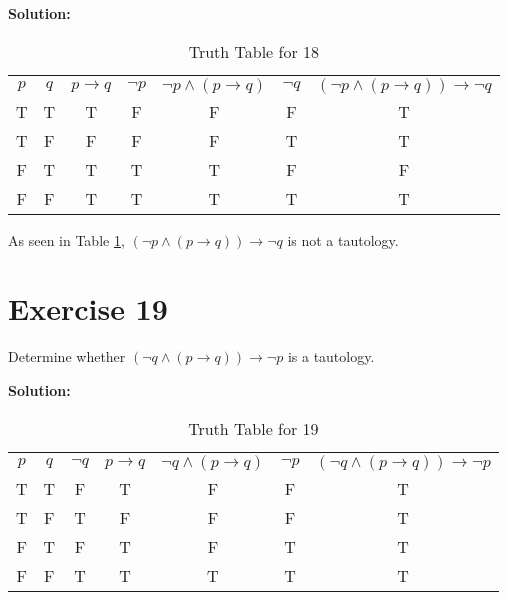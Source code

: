 \documentclass{Axon}
\begin{document}
\noindent
\textbf{Solution:}
\begin{table}[ht]
    \centering
    \begin{tabular}{c|c|c|c|c|c|c}
        \(p\) & \(q\) & \(p \to q\) & \(\lnot p\) & \(\lnot p \land (p \to q)\) & \(\lnot q\) & \((\lnot p \land (p \to q)) \to \lnot q\) \\
        T     & T     & T           & F           & F                           & F           & T                                         \\
        T     & F     & F           & F           & F                           & T           & T                                         \\
        F     & T     & T           & T           & T                           & F           & F                                         \\
        F     & F     & T           & T           & T                           & T           & T
    \end{tabular}
    \caption{Truth Table for 18}
    \label{Truth Table for 18}
\end{table}

As seen in Table \ref{Truth Table for 18}, \((\lnot p \land(p \to q)) \to \lnot q\) is not a tautology.

\section*{Exercise 19}
Determine whether \((\lnot q \land (p \to q)) \to \lnot p\) is a tautology.

\noindent
\textbf{Solution:}
\begin{table}[ht]
    \centering
    \begin{tabular}{c|c|c|c|c|c|c}
        \(p\) & \(q\) & \(\lnot q\) & \(p \to q\) & \(\lnot q \land (p \to q)\) & \(\lnot p\) & \((\lnot q \land (p \to q)) \to \lnot p\) \\
        T     & T     & F           & T           & F                           & F           & T                                         \\
        T     & F     & T           & F           & F                           & F           & T                                         \\
        F     & T     & F           & T           & F                           & T           & T                                         \\
        F     & F     & T           & T           & T                           & T           & T
    \end{tabular}
    \caption{Truth Table for 19}
    \label{Truth Table for 19}
\end{table}
\end{document}
